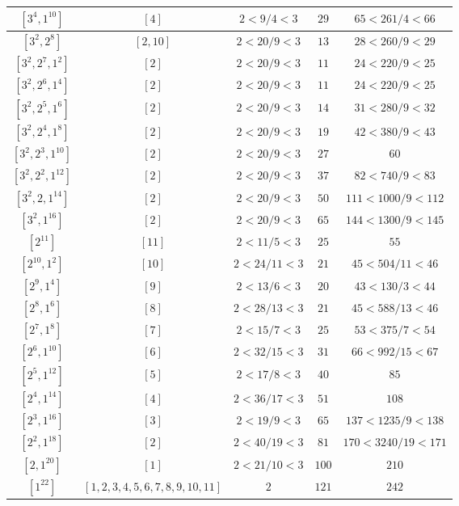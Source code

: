 \documentclass{article}%
\begin{document}
\begin{center}
\begin{longtable}{||c|c|c|c|c||}
$[3^{4}, 1^{10}]$ & $[4]$ & $2 < 9/4 < 3$ & $29$ & $65 < 261/4 < 66$ \\ \hline 
$[3^{2}, 2^{8}]$ & $[2, 10]$ & $2 < 20/9 < 3$ & $13$ & $28 < 260/9 < 29$ \\ \hline 
$[3^{2}, 2^{7}, 1^{2}]$ & $[2]$ & $2 < 20/9 < 3$ & $11$ & $24 < 220/9 < 25$ \\ \hline 
$[3^{2}, 2^{6}, 1^{4}]$ & $[2]$ & $2 < 20/9 < 3$ & $11$ & $24 < 220/9 < 25$ \\ \hline 
$[3^{2}, 2^{5}, 1^{6}]$ & $[2]$ & $2 < 20/9 < 3$ & $14$ & $31 < 280/9 < 32$ \\ \hline 
$[3^{2}, 2^{4}, 1^{8}]$ & $[2]$ & $2 < 20/9 < 3$ & $19$ & $42 < 380/9 < 43$ \\ \hline 
$[3^{2}, 2^{3}, 1^{10}]$ & $[2]$ & $2 < 20/9 < 3$ & $27$ & $60$ \\ \hline 
$[3^{2}, 2^{2}, 1^{12}]$ & $[2]$ & $2 < 20/9 < 3$ & $37$ & $82 < 740/9 < 83$ \\ \hline 
$[3^{2}, 2, 1^{14}]$ & $[2]$ & $2 < 20/9 < 3$ & $50$ & $111 < 1000/9 < 112$ \\ \hline 
$[3^{2}, 1^{16}]$ & $[2]$ & $2 < 20/9 < 3$ & $65$ & $144 < 1300/9 < 145$ \\ \hline 
$[2^{11}]$ & $[11]$ & $2 < 11/5 < 3$ & $25$ & $55$ \\ \hline 
$[2^{10}, 1^{2}]$ & $[10]$ & $2 < 24/11 < 3$ & $21$ & $45 < 504/11 < 46$ \\ \hline 
$[2^{9}, 1^{4}]$ & $[9]$ & $2 < 13/6 < 3$ & $20$ & $43 < 130/3 < 44$ \\ \hline 
$[2^{8}, 1^{6}]$ & $[8]$ & $2 < 28/13 < 3$ & $21$ & $45 < 588/13 < 46$ \\ \hline 
$[2^{7}, 1^{8}]$ & $[7]$ & $2 < 15/7 < 3$ & $25$ & $53 < 375/7 < 54$ \\ \hline 
$[2^{6}, 1^{10}]$ & $[6]$ & $2 < 32/15 < 3$ & $31$ & $66 < 992/15 < 67$ \\ \hline 
$[2^{5}, 1^{12}]$ & $[5]$ & $2 < 17/8 < 3$ & $40$ & $85$ \\ \hline 
$[2^{4}, 1^{14}]$ & $[4]$ & $2 < 36/17 < 3$ & $51$ & $108$ \\ \hline 
$[2^{3}, 1^{16}]$ & $[3]$ & $2 < 19/9 < 3$ & $65$ & $137 < 1235/9 < 138$ \\ \hline 
$[2^{2}, 1^{18}]$ & $[2]$ & $2 < 40/19 < 3$ & $81$ & $170 < 3240/19 < 171$ \\ \hline 
$[2, 1^{20}]$ & $[1]$ & $2 < 21/10 < 3$ & $100$ & $210$ \\ \hline 
$[1^{22}]$ & $[1, 2, 3, 4, 5, 6, 7, 8, 9, 10, 11]$ & $2$ & $121$ & $242$ \\ \hline 
    \end{longtable}
    \end{center}
\newpage
\end{document}
